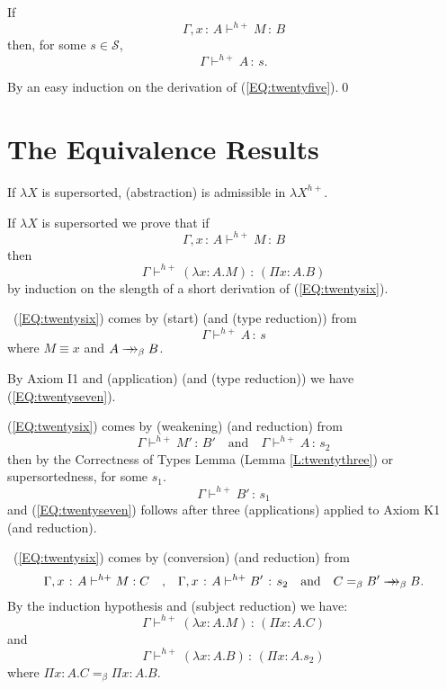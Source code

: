 \documentclass{LMCS}
\def\:{\mathbin{\,:\,}}
\begin{document}
\begin{lem}\label{L:twentyfour}
  If 
\begin{equation}\label{EQ:twentyfive}
 \Gamma, x\:A\vdash^{h +} M\:B
\end{equation}
  then, for some $s\in\mathcal S$,
\[\Gamma\vdash^{h +} A\:s.\]
\end{lem}

\proof By an easy induction on the derivation of (\ref{EQ:twentyfive}).\qed

\section{The Equivalence Results}\label{S:ER}

\begin{lem}\label{L:twentyfive}
  If $\lambda X$ is supersorted, (abstraction) is
  admissible in $\lambda X^{h +}.$
\end{lem}

\proof If $\lambda X$ is supersorted we prove that if
\begin{equation}\label{EQ:twentysix}
 \Gamma, x\:A\vdash^{h +} M\:B
\end{equation}
  then
\begin{equation}\label{EQ:twentyseven}
 \Gamma\vdash^{h +}(\lambda x{:}A.M)\:(\Pi x{:}A.B)
\end{equation}
  by induction on the slength of a short derivation of (\ref{EQ:twentysix}).

\ (\ref{EQ:twentysix}) comes by (start) (and (type reduction)) from
\[\Gamma\vdash^{h +}A\:s\]
  where $M\equiv x$ and $A\to\hskip -7pt \to_{\beta} B$.

  By Axiom I1 and (application) (and (type reduction)) we have (\ref{EQ:twentyseven}).

 (\ref{EQ:twentysix}) comes by (weakening) (and reduction) from
\[\Gamma\vdash^{h +}M'\:B'\quad\mbox{and}\quad\Gamma\vdash^{h +}A\:s_2\]
  then by the Correctness of Types Lemma (Lemma \ref{L:twentythree}) or
  supersortedness, for some $s_1$.
\[\Gamma\vdash^{h +} B'\:s_1\]
  and (\ref{EQ:twentyseven}) follows after three (applications) applied to Axiom K1 (and
  reduction).

\ (\ref{EQ:twentysix}) comes by (conversion) (and reduction) from
\[\Gamma, x\:A\vdash^{h+} M:C\quad\mbox{,}\quad
 \Gamma, x\:A\vdash^{h+} B'\:s_2\quad\mbox{and}\quad
  C=_{\beta} B'\to\hskip -7pt \to_{\beta}B.
\]
  By the induction hypothesis and (subject reduction) we have:
\begin{equation}\label{EQ:twentyeight}
 \Gamma\vdash^{h +} (\lambda x{:}A.M)\:(\Pi x{:}A.C)
\end{equation}
  and
\[\Gamma\vdash^{h +} (\lambda x{:}A.B)\:(\Pi x{:}A.s_2)\]
  where $\Pi x{:}A.C =_{\beta}\Pi x{:}A.B$.
\end{document}
